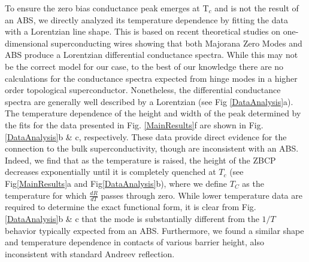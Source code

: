 To ensure the zero bias conductance peak emerges at T$_{c}$ and is not the result of an ABS, we directly analyzed its temperature dependence by fitting the data with a Lorentzian line shape. This is based on recent theoretical studies on one-dimensional superconducting wires showing that both Majorana Zero Modes and ABS produce a Lorentzian differential conductance spectra\cite{Setiawan2017}. While this may not be the correct model for our case, to the best of our knowledge there are no calculations for the conductance spectra expected from hinge modes in a higher order topological superconductor. Nonetheless, the differential conductance spectra are generally well described by a Lorentzian (see Fig \ref{DataAnalysis}a). The temperature dependence of the height and width of the peak determined by the fits for the data presented in Fig. \ref{MainResults}f are shown in Fig. \ref{DataAnalysis}b \& c, respectively. These data provide direct evidence for the connection to the bulk superconductivity, though are inconsistent with an ABS. Indeed, we find that as the temperature is raised, the height of the ZBCP decreases exponentially until it is completely quenched at $T_{c}$ (see Fig\ref{MainResults}a and Fig\ref{DataAnalysis}b), where we define $T_{C}$ as the temperature for which $\frac{dR}{dT}$ passes through zero. While lower temperature data are required to determine the exact functional form, it is clear from Fig. \ref{DataAnalysis}b \& c that the mode is substantially different from the $1/T$ behavior typically expected from an ABS. Furthermore, we found a similar shape and temperature dependence in contacts of various barrier height, also inconsistent with standard Andreev reflection.\cite{BTK,Tanaka2012,Lofwander2001}

